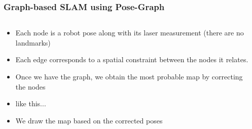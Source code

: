    \begin{frame}
   \frametitle{Graph-based SLAM using Pose-Graph}
   
   \begin{columns}
   \begin{column}{0.5\textwidth}
   \begin{itemize}
   \item<1-2> Each node is a robot pose along with its laser measurement (there are no landmarks)
   \item<1-2> Each edge corresponds to a spatial constraint between the nodes it relates. \item<3-> Once we have the graph, we obtain the most probable map by correcting the nodes
    \item<4-> like this...
    \item<5> We draw the map based on the corrected poses
    \end{itemize}
    \end{column}
    \begin{column}{0.5\textwidth} %

\end{column}
\end{columns}
\end{frame}
